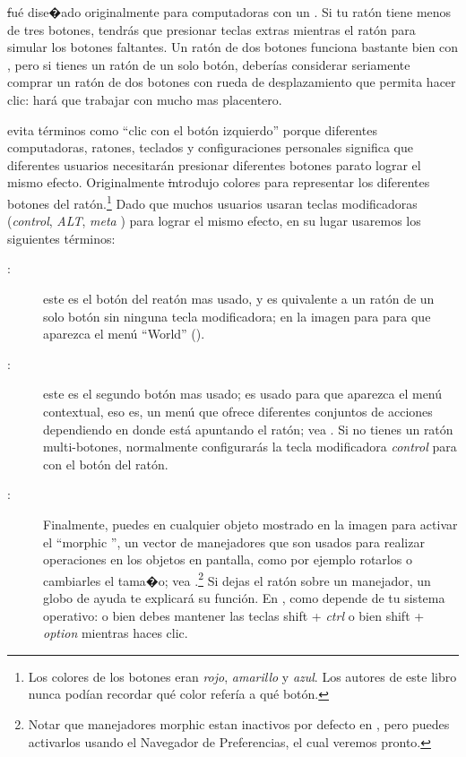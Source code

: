 \documentclass[a4paper,10pt,twoside]{book}
\begin{document}
\st fu\'e dise�ado originalmente para computadoras con un . Si tu rat\'on tiene menos de tres botones, tendr\'as que presionar teclas extras mientras  el rat\'on para simular los botones faltantes. Un rat\'on de dos botones funciona bastante bien con \pharo, pero si tienes un rat\'on de un solo bot\'on, deber\'ias considerar seriamente comprar un rat\'on de dos botones con rueda de desplazamiento que permita hacer clic: har\'a que trabajar con \pharo mucho mas placentero.

\pharo evita t\'erminos como ``clic con el bot\'on izquierdo'' porque diferentes computadoras, ratones, teclados y configuraciones personales significa que diferentes usuarios necesitar\'an presionar diferentes botones parato lograr el mismo efecto.
Originalmente \st introdujo colores para representar los diferentes botones del rat\'on.\footnote{Los colores de los botones eran \emph{rojo}, \emph{amarillo} y \emph{azul}. Los autores de este libro nunca pod\'ian recordar qu\'e color refer\'ia a qu\'e bot\'on.}
Dado que muchos usuarios usaran teclas modificadoras (\emph{control}, \emph{ALT}, \emph{meta} \etc) para lograr el mismo efecto, en su lugar usaremos los siguientes t\'erminos:
\begin{description}
\item [\click:] este es el bot\'on del reat\'on mas usado, y es quivalente a  un rat\'on de un solo bot\'on sin ninguna tecla modificadora; \click{} en la imagen para para que aparezca el men\'u ``World'' ().
\item [\actclick:] este es el segundo bot\'on mas usado; es usado para que aparezca el men\'u contextual, eso es, un men\'u que ofrece diferentes conjuntos de acciones dependiendo en donde est\'a apuntando el rat\'on; vea . Si no tienes un rat\'on multi-botones, normalmente configurar\'as la tecla modificadora \emph{control} para \actclick con el bot\'on del rat\'on.
\item [\metaclick:] Finalmente, puedes \metaclick en cualquier objeto mostrado en la imagen para activar el ``morphic '', un vector de manejadores que son usados para realizar operaciones en los objetos en pantalla, como por ejemplo rotarlos o cambiarles el tama�o; vea .\footnote{Notar que manejadores morphic estan inactivos por defecto en \pharo, pero puedes activarlos usando el Navegador de Preferencias, el cual veremos pronto.}
Si dejas el rat\'on sobre un manejador, un globo de ayuda te explicar\'a su funci\'on.
En \pharo, como \metaclick depende de tu sistema operativo:
o bien debes mantener las teclas {\sc shift} + \emph{ctrl} o bien {\sc shift} + \emph{option} mientras haces clic.
\end{description}
\end{document}
